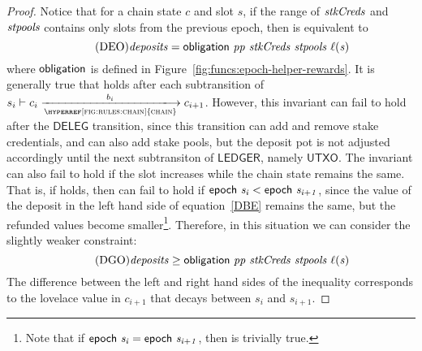 \begin{proof}
  Notice that for a chain state $c$ and slot $s$, if the range of
  $\mathit{stkCreds}$ and $\mathit{stpools}$ contains only slots from the previous epoch,
  then  is equivalent to
  \begin{equation}\tag{DEO}\label{DEO}
    \mathit{deposits} = \mathsf{obligation}~ \mathit{pp}~ \mathit{stkCreds}~ \mathit{stpools}~ \mathit{\ell(s)}
  \end{equation}
  where $\mathsf{obligation}$ is defined in Figure~\ref{fig:funcs:epoch-helper-rewards}.
%
  It is generally true that  holds after each subtransition of
  $s_i\vdash c_i\trans{\hyperref[fig:rules:chain]{chain}}{b_i}c_{i+1}$.
  However, this invariant can fail to hold after the
  $\hyperref[fig:delegation-transitions]{\mathsf{DELEG}}$ transition,
  since this transition can add and remove stake credentials, and can also add stake pools,
  but the deposit pot is not adjusted accordingly
  until the next subtransiton of $\hyperref[fig:rules:ledger]{\mathsf{LEDGER}}$,
  namely $\hyperref[fig:rules:utxo-shelley]{\mathsf{UTXO}}$.
%
  The invariant can also fail to hold if the slot increases while the chain state remains the same.
  That is, if  holds, then  can fail to hold if
  $\mathsf{epoch}~ \mathit{s_i} < \mathsf{epoch}~ \mathit{s_{i+1}}$, since the value of the deposit
  in the left hand side of equation~\ref{DBE} remains the same, but the
  refunded values become smaller\footnote{Note that if $\mathsf{epoch}~ \mathit{s_i} = \mathsf{epoch}~ \mathit{s_{i+1}}$, then  is trivially true.}.
  Therefore, in this situation we can consider the slightly weaker constraint:
  \begin{equation}\tag{DGO}\label{DGTO}
    \mathit{deposits} \geq \mathsf{obligation}~ \mathit{pp}~ \mathit{stkCreds}~ \mathit{stpools}~ \mathit{\ell(s)}
  \end{equation}
  The difference between the left and right hand sides of the inequality
  corresponds to the lovelace value in $c_{i+1}$ that decays between $s_i$ and $s_{i+1}$.


\end{proof}
